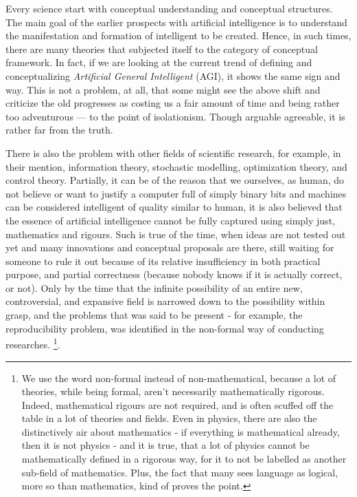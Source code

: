 Every science start with conceptual understanding and conceptual structures. The main goal of the earlier prospects with artificial intelligence is to understand the manifestation and formation of intelligent to be created. Hence, in such times, there are many theories that subjected itself to the category of conceptual framework. In fact, if we are looking at the current trend of defining and conceptualizing \textit{Artificial General Intelligent} (AGI), it shows the same sign and way. This is not a problem, at all, that some might see the above shift and criticize the old progresses as costing us a fair amount of time and being rather too adventurous --- to the point of isolationism. Though arguable agreeable, it is rather far from the truth. 

There is also the problem with other fields of scientific research, for example, in their mention, information theory, stochastic modelling, optimization theory, and control theory. Partially, it can be of the reason that we ourselves, as human, do not believe or want to justify a computer full of simply binary bits and machines can be considered intelligent of quality similar to human, it is also believed that the essence of artificial intelligence cannot be fully captured using simply just, mathematics and rigours. Such is true of the time, when ideas are not tested out yet and many innovations and conceptual proposals are there, still waiting for someone to rule it out because of its relative insufficiency in both practical purpose, and partial correctness (because nobody knows if it is actually correct, or not). Only by the time that the infinite possibility of an entire new, controversial, and expansive field is narrowed down to the possibility within grasp, and the problems that was said to be present - for example, the reproducibility problem, was identified in the non-formal way of conducting researches. \footnote{We use the word non-formal instead of non-mathematical, because a lot of theories, while being formal, aren't necessarily mathematically rigorous. Indeed, mathematical rigours are not required, and is often scuffed off the table in a lot of theories and fields. Even in physics, there are also the distinctively air about mathematics - if everything is mathematical already, then it is not physics - and it is true, that a lot of physics cannot be mathematically defined in a rigorous way, for it to not be labelled as another sub-field of mathematics. Plus, the fact that many sees language as logical, more so than mathematics, kind of proves the point.}. 

